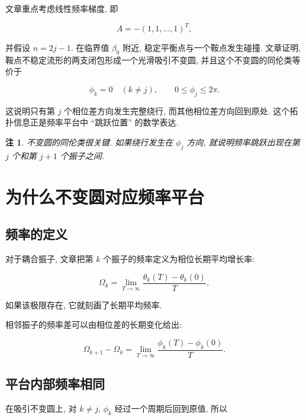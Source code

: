 \documentclass[oneside]{ctexart}
\newtheorem{remark}{注}[section]
\begin{document}
文章重点考虑线性频率梯度, 即

\begin{equation}
    A=-(1,1,
\dots,1)^T,
\end{equation}

并假设 $n=2j-1$. 在临界值 $\beta_0$ 附近, 稳定平衡点与一个鞍点发生碰撞. 文章证明, 鞍点不稳定流形的两支闭包形成一个光滑吸引不变圆, 并且这个不变圆的同伦类等价于

\begin{equation}
    \phi_k=0\quad (k\neq j),
    \qquad
    0\leq \phi_j\leq 2\pi.
\end{equation}

这说明只有第 $j$ 个相位差方向发生完整绕行, 而其他相位差方向回到原处. 这个拓扑信息正是频率平台中 ``跳跃位置'' 的数学表达.

\begin{remark}
    不变圆的同伦类很关键. 如果绕行发生在 $\phi_j$ 方向, 就说明频率跳跃出现在第 $j$ 个和第 $j+1$ 个振子之间.
\end{remark}

\section{为什么不变圆对应频率平台}

\subsection{频率的定义}

对于耦合振子, 文章把第 $k$ 个振子的频率定义为相位长期平均增长率:

\begin{equation}
    \Omega_k=\lim_{T\to\infty}\dfrac{\theta_k(T)-\theta_k(0)}{T},
\end{equation}

如果该极限存在, 它就刻画了长期平均频率.

相邻振子的频率差可以由相位差的长期变化给出:

\begin{equation}
    \Omega_{k+1}-\Omega_k
    =\lim_{T\to\infty}\dfrac{\phi_k(T)-\phi_k(0)}{T}.
\end{equation}

\subsection{平台内部频率相同}

在吸引不变圆上, 对 $k\neq j$, $\phi_k$ 经过一个周期后回到原值, 所以
\end{document}
